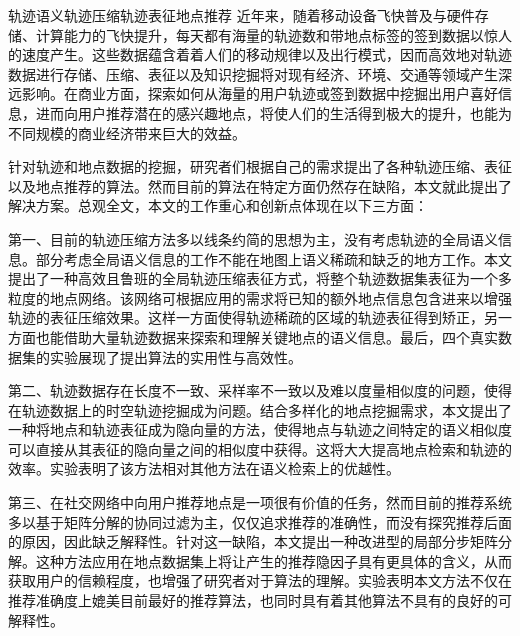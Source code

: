 
\begin{Cabstract}{轨迹语义}{轨迹压缩}{轨迹表征}{地点推荐}{}
近年来，随着移动设备飞快普及与硬件存储、计算能力的飞快提升，每天都有海量的轨迹数和带地点标签的签到数据以惊人的速度产生。这些数据蕴含着着人们的移动规律以及出行模式，因而高效地对轨迹数据进行存储、压缩、表征以及知识挖掘将对现有经济、环境、交通等领域产生深远影响。在商业方面，探索如何从海量的用户轨迹或签到数据中挖掘出用户喜好信息，进而向用户推荐潜在的感兴趣地点，将使人们的生活得到极大的提升，也能为不同规模的商业经济带来巨大的效益。

针对轨迹和地点数据的挖掘，研究者们根据自己的需求提出了各种轨迹压缩、表征以及地点推荐的算法。然而目前的算法在特定方面仍然存在缺陷，本文就此提出了解决方案。总观全文，本文的工作重心和创新点体现在以下三方面：

第一、目前的轨迹压缩方法多以线条约简的思想为主，没有考虑轨迹的全局语义信息。部分考虑全局语义信息的工作不能在地图上语义稀疏和缺乏的地方工作。本文提出了一种高效且鲁班的全局轨迹压缩表征方式，将整个轨迹数据集表征为一个多粒度的地点网络。该网络可根据应用的需求将已知的额外地点信息包含进来以增强轨迹的表征压缩效果。这样一方面使得轨迹稀疏的区域的轨迹表征得到矫正，另一方面也能借助大量轨迹数据来探索和理解关键地点的语义信息。最后，四个真实数据集的实验展现了提出算法的实用性与高效性。

第二、轨迹数据存在长度不一致、采样率不一致以及难以度量相似度的问题，使得在轨迹数据上的时空轨迹挖掘成为问题。结合多样化的地点挖掘需求，本文提出了一种将地点和轨迹表征成为隐向量的方法，使得地点与轨迹之间特定的语义相似度可以直接从其表征的隐向量之间的相似度中获得。这将大大提高地点检索和轨迹的效率。实验表明了该方法相对其他方法在语义检索上的优越性。

第三、在社交网络中向用户推荐地点是一项很有价值的任务，然而目前的推荐系统多以基于矩阵分解的协同过滤为主，仅仅追求推荐的准确性，而没有探究推荐后面的原因，因此缺乏解释性。针对这一缺陷，本文提出一种改进型的局部分步矩阵分解。这种方法应用在地点数据集上将让产生的推荐隐因子具有更具体的含义，从而获取用户的信赖程度，也增强了研究者对于算法的理解。实验表明本文方法不仅在推荐准确度上媲美目前最好的推荐算法，也同时具有着其他算法不具有的良好的可解释性。
\end{Cabstract}


